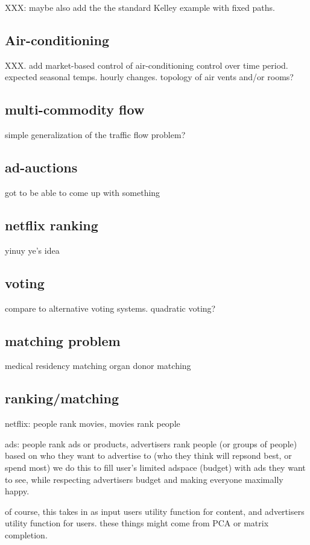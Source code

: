 \documentclass[12pt]{article}
\begin{document}
XXX: maybe also add the the standard Kelley example with fixed paths.


\subsection{Air-conditioning}
XXX. add market-based control of air-conditioning \cite{clearwater1996market}
control over time period. expected seasonal temps.
hourly changes. topology of air vents and/or rooms?


\subsection{multi-commodity flow}
simple generalization of the traffic flow problem?

\subsection{ad-auctions}
got to be able to come up with something

\subsection{netflix ranking}
yinuy ye's idea

\subsection{voting}
compare to alternative voting systems. quadratic voting?

\subsection{matching problem}
medical residency matching
organ donor matching

\subsection{ranking/matching}
netflix: people rank movies, movies rank people

ads: people rank ads or products, advertisers rank people (or groups of people)
based on who they want to advertise to (who they think will repsond best, or spend most)
we do this to fill user's limited adspace (budget) with ads they want to see,
while respecting advertisers budget and making everyone maximally happy.

of course, this takes in as input users utility function for content, and advertisers
utility function for users. these things might come from PCA or matrix completion.


\newpage


\end{document}
